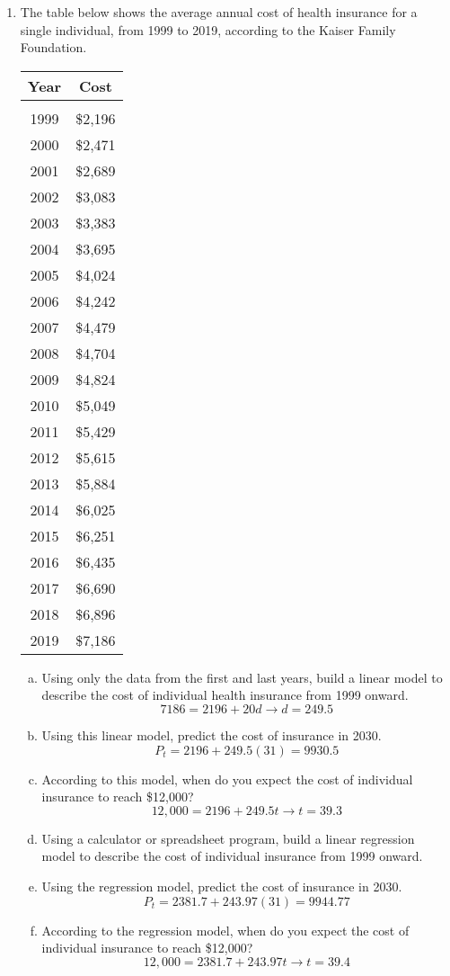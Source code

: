 \begin{enumerate}
\item The table below shows the average annual cost of health insurance for a single individual, from 1999 to 2019, according to the Kaiser Family Foundation.
\begin{center}
\begin{tabular}{c c}
\textbf{Year} & \textbf{Cost}\\
\hline
 & \\
1999 & \$2,196\\
2000 & \$2,471\\
2001 & \$2,689\\
2002 & \$3,083\\
2003 & \$3,383\\
2004 & \$3,695\\
2005 & \$4,024\\
2006 & \$4,242\\
2007 & \$4,479\\
2008 & \$4,704\\
2009 & \$4,824\\
2010 & \$5,049\\
2011 & \$5,429\\
2012 & \$5,615\\
2013 & \$5,884\\
2014 & \$6,025\\
2015 & \$6,251\\
2016 & \$6,435\\
2017 & \$6,690\\
2018 & \$6,896\\
2019 & \$7,186
\end{tabular}
\end{center}
\begin{enumerate}[(a)]
\item Using only the data from the first and last years, build a linear model to describe the cost of individual health insurance from 1999 onward. 
\[7186 = 2196 + 20d \longrightarrow d = 249.5\]
\item Using this linear model, predict the cost of insurance in 2030. 
\[P_t = 2196 + 249.5(31) = 9930.5\]
\item According to this model, when do you expect the cost of individual insurance to reach \$12,000? 
\[12,000 = 2196 + 249.5t \longrightarrow t = 39.3\]
\item Using a calculator or spreadsheet program, build a linear regression model to describe the cost of individual insurance from 1999 onward. 
\item Using the regression model, predict the cost of insurance in 2030. 
\[P_t = 2381.7 + 243.97(31) = 9944.77\]
\item According to the regression model, when do you expect the cost of individual insurance to reach \$12,000? 
\[12,000 = 2381.7 + 243.97t \longrightarrow t = 39.4\]
\end{enumerate}


\end{enumerate}
